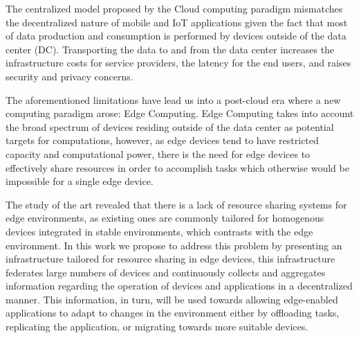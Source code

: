 

The centralized model proposed by the Cloud computing paradigm mismatches the decentralized nature of mobile and IoT applications given the fact that most of data production and consumption is performed by devices outside of the data center (DC). Transporting the data to and from the data center increases the infrastructure costs for service providers, the latency for the end users, and raises security and privacy concerns. 

The aforementioned limitations have lead us into a post-cloud era where a new computing paradigm arose: Edge Computing. Edge Computing takes into account the broad spectrum of devices residing outside of the data center as potential targets for computations, however, as edge devices tend to have restricted capacity and computational power, there is the need for edge devices to effectively share resources in order to accomplish tasks which otherwise would be impossible for a single edge device. 

The study of the art revealed that there is a lack of resource sharing systems for edge environments, as existing ones are commonly tailored for homogenous devices integrated in stable environments, which contrasts with the edge environment. In this work we propose to address this problem by presenting an infrastructure tailored for resource sharing in edge devices, this infrastructure federates large numbers of devices and continuously collects and aggregates information regarding the operation of devices and applications in a decentralized manner. This information, in turn, will be used towards allowing edge-enabled applications to adapt to changes in the environment either by offloading tasks, replicating the application, or migrating towards more suitable devices. 